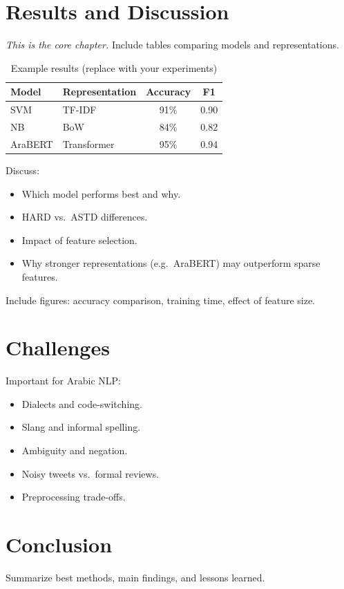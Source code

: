 \documentclass[11pt,a4paper]{report}
\begin{document}
\chapter{Results and Discussion}
\textit{This is the core chapter.} Include tables comparing models and representations.

\begin{table}[htbp]
    \centering
    \caption{Example results (replace with your experiments)}
    \begin{tabular}{@{}llcc@{}}
        \toprule
        \textbf{Model} & \textbf{Representation} & \textbf{Accuracy} & \textbf{F1} \\
        \midrule
        SVM      & TF-IDF      & 91\% & 0.90 \\
        NB       & BoW         & 84\% & 0.82 \\
        AraBERT  & Transformer & 95\% & 0.94 \\
        \bottomrule
    \end{tabular}
\end{table}

Discuss:
\begin{itemize}[noitemsep]
    \item Which model performs best and why.
    \item HARD vs.\ ASTD differences.
    \item Impact of feature selection.
    \item Why stronger representations (e.g.\ AraBERT) may outperform sparse features.
\end{itemize}

Include figures: accuracy comparison, training time, effect of feature size.

\chapter{Challenges}
Important for Arabic NLP:
\begin{itemize}[noitemsep]
    \item Dialects and code-switching.
    \item Slang and informal spelling.
    \item Ambiguity and negation.
    \item Noisy tweets vs.\ formal reviews.
    \item Preprocessing trade-offs.
\end{itemize}

\chapter{Conclusion}
Summarize best methods, main findings, and lessons learned.
\end{document}
